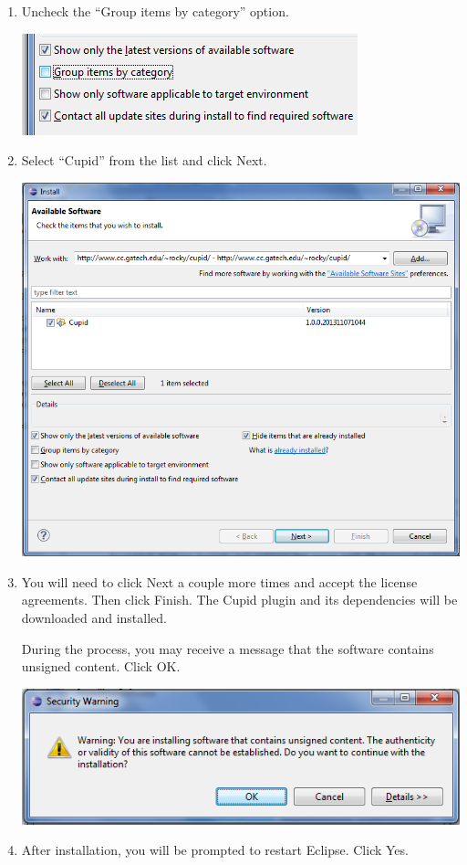 \documentclass[oneside,11pt]{memoir}
\begin{document}
\begin{enumerate}
\begin{enumerate}
\item Uncheck the ``Group items by category'' option.

\parbox{\linewidth}{\centering
  \includegraphics{figs/install_fig3.png}
}

\item Select ``Cupid'' from the list and click Next.

\parbox{\linewidth}{\centering
  \includegraphics{figs/install_fig4.png}
}

\item You will need to click Next a couple more times and accept the license agreements. Then click Finish.  The Cupid plugin and its dependencies will be downloaded and installed. 

During the process, you may receive a message that the software contains unsigned content.  Click OK.

\parbox{\linewidth}{\centering
  \includegraphics{figs/install_fig5.png}
}

\item After installation, you will be prompted to restart Eclipse.  Click Yes.

\end{enumerate}
\end{enumerate}
\end{document}
